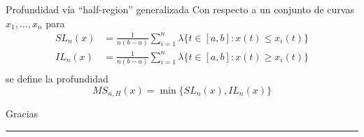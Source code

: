 \documentclass[10pt]{beamer}
\begin{document}
{{\begin{frame}{Profundidad vía ``half-region'' generalizada}
Con respecto a un conjunto de curvas $x_1,\ldots,x_n$ para
    \begin{align*}
        SL_n(x)&=\frac{1}{n(b-a)}\sum_{i=1}^{n}\lambda\{t\in[a,b]:x(t)\leq x_i(t)\}\\
        IL_n(x)&=\frac{1}{n(b-a)}\sum_{i=1}^{n}\lambda\{t\in[a,b]:x(t)\geq x_i(t)\}\\
    \end{align*}
    se define la profundidad
    $$MS_{n,H}(x)=\min\{SL_n(x),IL_n(x)\}$$
\end{frame}

\begin{frame}[standout]
    Gracias
    \rule[8pt]{\textwidth}{0.4pt}
\end{frame}

} %
} %
\end{document}
